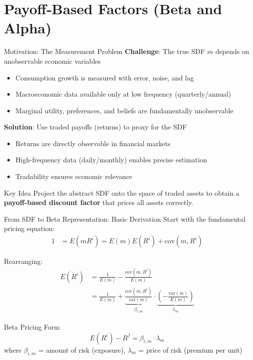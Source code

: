 \documentclass{beamer}
\begin{document}
\section{Payoff‐Based Factors (Beta and Alpha)}\label{beta}

\begin{frame}{Motivation: The Measurement Problem}
	\textbf{Challenge}: The true SDF $m$ depends on unobservable economic variables
	\begin{itemize}
		\item Consumption growth is measured with error, noise, and lag
		\item Macroeconomic data available only at low frequency (quarterly/annual)
		\item Marginal utility, preferences, and beliefs are fundamentally unobservable
	\end{itemize}
	
	\vspace{8pt}
	\textbf{Solution}: Use \alert{traded payoffs} (returns) to proxy for the SDF
	\begin{itemize}
		\item Returns are directly observable in financial markets
		\item High-frequency data (daily/monthly) enables precise estimation
		\item Tradability ensures economic relevance
	\end{itemize}
	
	\vspace{8pt}
	\begin{block}{Key Idea}
		Project the abstract SDF onto the space of traded assets to obtain a \textbf{payoff-based discount factor} that prices all assets correctly.
	\end{block}
\end{frame}

\begin{frame}{From SDF to Beta Representation: Basic Derivation}
	Start with the fundamental pricing equation:
	\begin{align*}
		1 &= E(mR^i) = E(m)E(R^i) + \text{cov}(m, R^i)
	\end{align*}
	
	Rearranging:
	\begin{align*}
		E(R^i) &= \frac{1}{E(m)} - \frac{\text{cov}(m, R^i)}{E(m)} \\[6pt]
		&= \frac{1}{E(m)} + \underbrace{\frac{\text{cov}(m, R^i)}{\text{var}(m)}}_{\beta_{i,m}} \cdot \underbrace{\left(-\frac{\text{var}(m)}{E(m)}\right)}_{\lambda_m}
	\end{align*}
	
	\vspace{5pt}
	\begin{block}{Beta Pricing Form}
		\vspace{-8pt}
		\begin{equation*}
			E(R^i) - R^f = \beta_{i,m} \cdot \lambda_m
		\end{equation*}
		where $\beta_{i,m}$ = amount of risk (exposure), $\lambda_m$ = price of risk (premium per unit)
	\end{block}
\end{frame}
\end{document}
